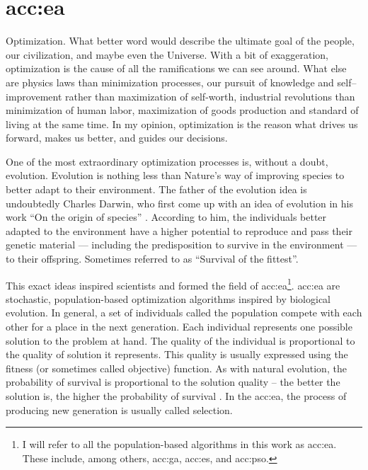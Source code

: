 \chapter{\texorpdfstring{\acrlong*{acc:ea}}{Evolutionary algorithms}}
\label{chap:eva}

Optimization. What better word would describe the ultimate goal of the people, our civilization, and maybe even the Universe. With a bit of exaggeration, optimization is the cause of all the ramifications we can see around. What else are physics laws than minimization processes, our pursuit of knowledge and self--improvement rather than maximization of self-worth, industrial revolutions than minimization of human labor, maximization of goods production and standard of living at the same time. In my opinion, optimization is the reason what drives us forward, makes us better, and guides our decisions.

One of the most extraordinary optimization processes is, without a doubt, evolution. Evolution is nothing less than Nature's way of improving species to better adapt to their environment. The father of the evolution idea is undoubtedly Charles Darwin, who first come up with an idea of evolution in his work \enquote{On the origin of species} \citep{darwinOriginal}. According to him, the individuals better adapted to the environment have a higher potential to reproduce and pass their genetic material --- including the predisposition to survive in the environment --- to their offspring. Sometimes referred to as \enquote{Survival of the fittest}.

This exact ideas inspired scientists and formed the field of \acrfull{acc:ea}\footnote{I will refer to all the population-based algorithms in this work as \acrlong*{acc:ea}. These include, among others, \acrlong*{acc:ga}, \acrlong*{acc:es}, and \acrlong*{acc:pso}.}.
\acrshort{acc:ea} are stochastic, population-based optimization algorithms inspired by biological evolution. In general, a set of individuals called the population compete with each other for a place in the next generation. Each individual represents one possible solution to the problem at hand. The quality of the individual is proportional to the quality of solution it represents. This quality is usually expressed using the fitness (or sometimes called objective) function. As with natural evolution, the probability of survival is proportional to the solution quality -- the better the solution is, the higher the probability of survival \citep{IntroductionToEA}. In the \acrshort{acc:ea}, the process of producing new generation is usually called selection.


